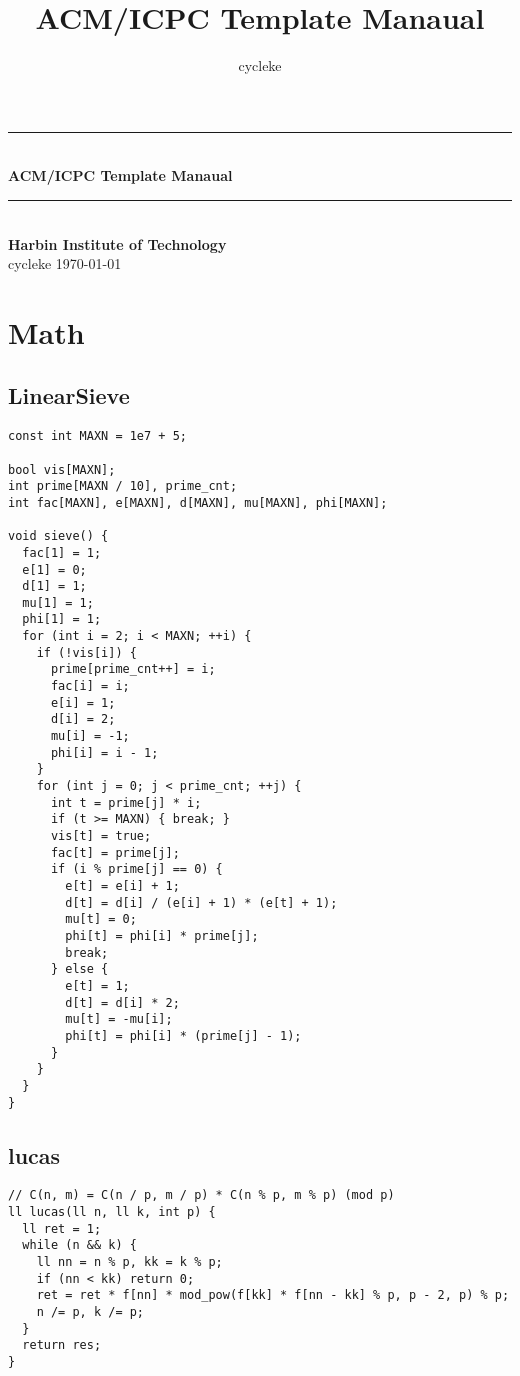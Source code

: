 \documentclass[twoside]{article}
\title{ACM/ICPC Template Manaual}
\author{cycleke}
\newcommand{\HRule}{\rule{\linewidth}{0.5mm}}
\begin{document}
\small
\begin{titlepage}
  \begin{center}
    \HRule \\ [1cm]
    \textbf{\Huge{ACM/ICPC Template Manaual}} \\ [0.5cm]
    \HRule \\ [4cm]
    \textbf{\Huge{Harbin Institute of Technology}} \\ [1cm]
    \LARGE{cycleke}
    \vfill
    \Large{\today}
  \end{center}
  \clearpage
\end{titlepage}
\tableofcontents\clearpage
\pagestyle{fancy}
\lfoot{}
\cfoot{\thepage}\rfoot{}
\setcounter{section}{0}
\setcounter{page}{1}
\clearpage

\section{Math}

\subsection{LinearSieve}
\begin{lstlisting}
const int MAXN = 1e7 + 5;

bool vis[MAXN];
int prime[MAXN / 10], prime_cnt;
int fac[MAXN], e[MAXN], d[MAXN], mu[MAXN], phi[MAXN];

void sieve() {
  fac[1] = 1;
  e[1] = 0;
  d[1] = 1;
  mu[1] = 1;
  phi[1] = 1;
  for (int i = 2; i < MAXN; ++i) {
    if (!vis[i]) {
      prime[prime_cnt++] = i;
      fac[i] = i;
      e[i] = 1;
      d[i] = 2;
      mu[i] = -1;
      phi[i] = i - 1;
    }
    for (int j = 0; j < prime_cnt; ++j) {
      int t = prime[j] * i;
      if (t >= MAXN) { break; }
      vis[t] = true;
      fac[t] = prime[j];
      if (i % prime[j] == 0) {
        e[t] = e[i] + 1;
        d[t] = d[i] / (e[i] + 1) * (e[t] + 1);
        mu[t] = 0;
        phi[t] = phi[i] * prime[j];
        break;
      } else {
        e[t] = 1;
        d[t] = d[i] * 2;
        mu[t] = -mu[i];
        phi[t] = phi[i] * (prime[j] - 1);
      }
    }
  }
}

\end{lstlisting}
\subsection{lucas}
\begin{lstlisting}
// C(n, m) = C(n / p, m / p) * C(n % p, m % p) (mod p)
ll lucas(ll n, ll k, int p) {
  ll ret = 1;
  while (n && k) {
    ll nn = n % p, kk = k % p;
    if (nn < kk) return 0;
    ret = ret * f[nn] * mod_pow(f[kk] * f[nn - kk] % p, p - 2, p) % p;
    n /= p, k /= p;
  }
  return res;
}

\end{lstlisting}
\end{document}
